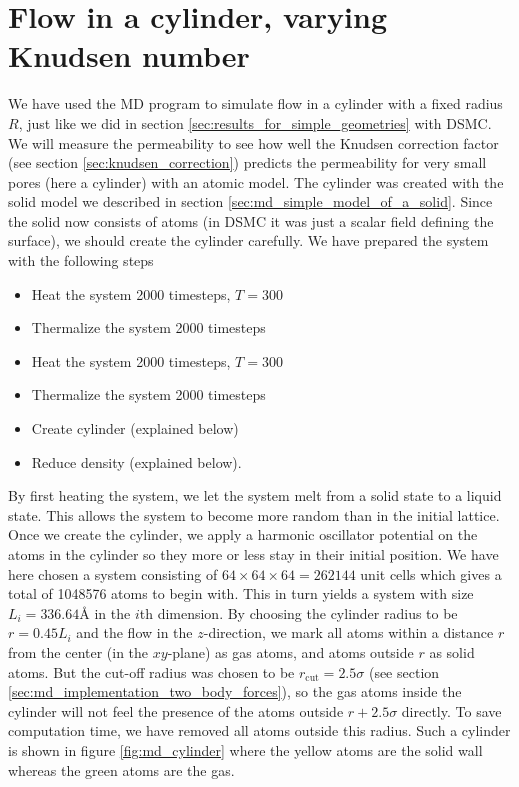 \section{Flow in a cylinder, varying Knudsen number}
\label{sec:md_cylinder_result}
We have used the MD program to simulate flow in a cylinder with a fixed radius $R$, just like we did in section \ref{sec:results_for_simple_geometries} with DSMC. We will measure the permeability to see how well the Knudsen correction factor (see section \ref{sec:knudsen_correction}) predicts the permeability for very small pores (here a cylinder) with an atomic model. The cylinder was created with the solid model we described in section \ref{sec:md_simple_model_of_a_solid}. Since the solid now consists of atoms (in DSMC it was just a scalar field defining the surface), we should create the cylinder carefully. We have prepared the system with the following steps
\begin{itemize}
	\item Heat the system 2000 timesteps, $T=$\unit{300}{\kelvin}
	\item Thermalize the system 2000 timesteps
	\item Heat the system 2000 timesteps, $T=$\unit{300}{\kelvin}
	\item Thermalize the system 2000 timesteps
	\item Create cylinder (explained below)
	\item Reduce density (explained below).
\end{itemize}
By first heating the system, we let the system melt from a solid state to a liquid state. This allows the system to become more random than in the initial lattice. Once we create the cylinder, we apply a harmonic oscillator potential on the atoms in the cylinder so they more or less stay in their initial position. We have here chosen a system consisting of $64\times64\times64=262144$ unit cells which gives a total of 1048576 atoms to begin with. This in turn yields a system with size $L_i=336.64Å$ in the $i$th dimension. By choosing the cylinder radius to be $r=0.45L_i$ and the flow in the $z$-direction, we mark all atoms within a distance $r$ from the center (in the $xy$-plane) as gas atoms, and atoms outside $r$ as solid atoms. But the cut-off radius was chosen to be $r_\text{cut}=2.5\sigma$ (see section \ref{sec:md_implementation_two_body_forces}), so the gas atoms inside the cylinder will not feel the presence of the atoms outside $r+2.5\sigma$ directly. To save computation time, we have removed all atoms outside this radius. Such a cylinder is shown in figure \ref{fig:md_cylinder} where the yellow atoms are the solid wall whereas the green atoms are the gas.
